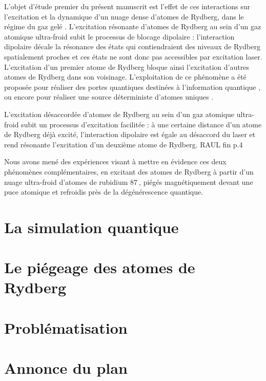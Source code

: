 \bigskip

L'objet d'étude premier du présent manuscrit est l'effet de ces interactions sur l'excitation et la dynamique d'un nuage dense d'atomes de Rydberg, dans le régime du \og gaz gelé \fg{}.
L'excitation résonante d'atomes de Rydberg au sein d'un gaz atomique ultra-froid subit le processus de \og blocage dipolaire \fg{} \cite{Lukin2001} :
l'interaction dipolaire décale la résonance des états qui contiendraient des niveaux de Rydberg spatialement proches et ces états ne sont donc pas accessibles par excitation laser.
L'excitation d'un premier atome de Rydberg bloque ainsi l'excitation d'autres atomes de Rydberg dans son voisinage.
L'exploitation de ce phénomène a été proposée pour réaliser des portes quantiques destinées à l'information quantique \cite{Lukin2001,Lukin2000b,Saffman2010}, ou encore pour réaliser une source déterministe d'atomes uniques \cite{Saffman2002}.

L'excitation désaccordée d'atomes de Rydberg au sein d'un gaz atomique ultra-froid subit un processus d'\og excitation facilitée \fg{} :
à une certaine distance d'un atome de Rydberg déjà excité, l'interaction dipolaire est égale au désaccord du laser et rend résonante l'excitation d'un deuxième atome de Rydberg.
RAUL fin p.4

Nous avons mené des expériences visant à mettre en évidence ces deux phénomènes complémentaires, en excitant des atomes de Rydberg à partir d'un nuage ultra-froid d'atomes de rubidium $\SI{87}{}$, piégés magnétiquement devant une puce atomique et refroidis près de la dégénérescence quantique.

\bigskip
\section*{La simulation quantique}

\bigskip
\section*{Le piégeage des atomes de Rydberg}

\section*{Problématisation}
\section*{Annonce du plan}

